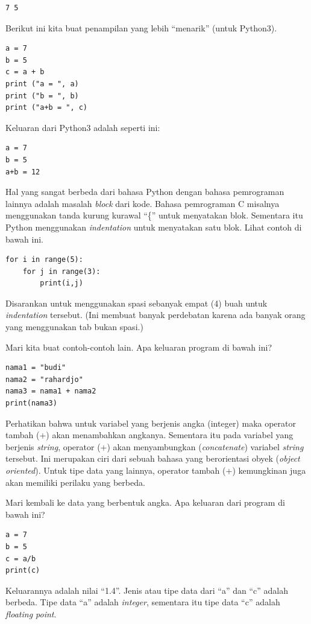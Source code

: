 \begin{verbatim}
7 5
\end{verbatim}

Berikut ini kita buat penampilan yang lebih ``menarik'' (untuk Python3).
\begin{verbatim}
a = 7
b = 5
c = a + b
print ("a = ", a)
print ("b = ", b)
print ("a+b = ", c)
\end{verbatim}

Keluaran dari Python3 adalah seperti ini:
\begin{verbatim}
a = 7
b = 5
a+b = 12
\end{verbatim}

Hal yang sangat berbeda dari bahasa Python dengan
bahasa pemrograman lainnya adalah masalah {\em block} dari kode. 
Bahasa pemrograman C misalnya menggunakan tanda kurung kurawal ``\{'' 
untuk menyatakan blok. Sementara itu Python menggunakan {\em indentation} 
untuk menyatakan satu blok. Lihat contoh di bawah ini.

\begin{verbatim}
for i in range(5):
    for j in range(3):
        print(i,j)
\end{verbatim}

Disarankan untuk menggunakan spasi sebanyak empat (4) buah untuk {\em
indentation} tersebut. (Ini membuat banyak perdebatan karena ada banyak orang
yang menggunakan tab bukan spasi.)

Mari kita buat contoh-contoh lain. Apa keluaran program di bawah ini?
\begin{verbatim}
nama1 = "budi"
nama2 = "rahardjo"
nama3 = nama1 + nama2
print(nama3)
\end{verbatim}

Perhatikan bahwa untuk variabel yang berjenis angka (integer) maka operator 
tambah (+) akan menambahkan angkanya. Sementara itu pada variabel yang
berjenis {\em string}, operator (+) akan menyambungkan ({\em concatenate})
variabel {\em string} tersebut.
Ini merupakan ciri dari sebuah bahasa yang berorientasi obyek
({\em object oriented}).
Untuk tipe data yang lainnya, operator tambah (+) kemungkinan juga akan
memiliki perilaku yang berbeda.

Mari kembali ke data yang berbentuk angka. Apa keluaran dari program
di bawah ini?
\begin{verbatim}
a = 7
b = 5
c = a/b
print(c)
\end{verbatim}

Keluarannya adalah nilai ``1.4''. Jenis atau tipe data dari ``a'' dan ``c''
adalah berbeda. Tipe data ``a'' adalah {\em integer}, sementara itu
tipe data ``c'' adalah {\em floating point}.

